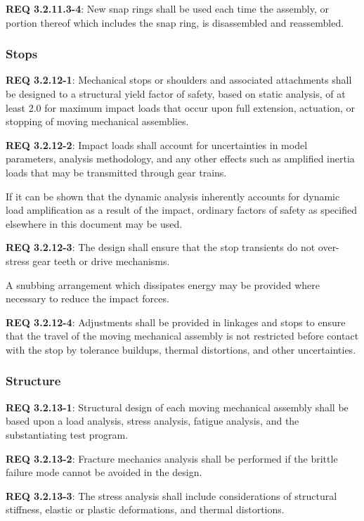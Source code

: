 \documentclass[12pt]{article}
\begin{document}
\noindent \textbf{REQ 3.2.11.3-4}: New snap rings shall be used each time the assembly, or portion thereof which includes the snap ring, is disassembled and reassembled.


\clearpage
\subsubsection{Stops} %
\noindent \textbf{REQ 3.2.12-1}: Mechanical stops or shoulders and associated attachments shall be designed to a structural yield factor of safety, based on static analysis, of at least 2.0 for maximum impact loads that occur upon full extension, actuation, or stopping of moving mechanical assemblies. 

\noindent \textbf{REQ 3.2.12-2}: Impact loads shall account for uncertainties in model parameters, analysis methodology, and any other effects such as amplified inertia loads that may be transmitted through gear trains. 

If it can be shown that the dynamic analysis inherently accounts for dynamic load amplification as a result of the impact, ordinary factors of safety as specified elsewhere in this document may be used.

\noindent \textbf{REQ 3.2.12-3}: The design shall ensure that the stop transients do not over-stress gear teeth or drive mechanisms. 

A snubbing arrangement which dissipates energy may be provided where necessary to reduce the impact forces. 

\noindent \textbf{REQ 3.2.12-4}: Adjustments shall be provided in linkages and stops to ensure that the travel of the moving mechanical assembly is not restricted before contact with the stop by tolerance buildups, thermal distortions, and other uncertainties.


\subsubsection{Structure} %
\noindent \textbf{REQ 3.2.13-1}: Structural design of each moving mechanical assembly shall be based upon a load analysis, stress analysis, fatigue analysis, and the substantiating test program. 

\noindent \textbf{REQ 3.2.13-2}: Fracture mechanics analysis shall be performed if the brittle failure mode cannot be avoided in the design. 

\noindent \textbf{REQ 3.2.13-3}: The stress analysis shall include considerations of structural stiffness, elastic or plastic deformations, and thermal distortions. 
\end{document}
